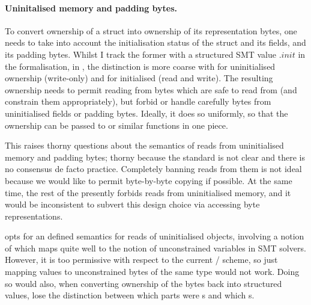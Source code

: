 \paragraph{Uninitalised memory and padding bytes.}%
To convert ownership of a struct into ownership of its representation bytes,
one needs to take into account the initialisation status of the struct and its
fields, and its padding bytes. Whilst I track the former with a structured SMT
value $.\mathit{init}$ in the formalisation, in , the distinction is
more coarse with  for uninitialised ownership (write-only) and
 for initialised (read and write). The resulting ownership
needs to permit reading from bytes which are safe to read from (and constrain
them appropriately), but forbid or handle carefully bytes from uninitialised
fields or padding bytes. Ideally, it does so uniformly, so that the ownership
can be passed to  or similar functions in one piece.

This raises thorny questions about the semantics of reads from uninitialised
memory and padding bytes; thorny because the  standard is not clear and
there is no consensus de facto practice. Completely banning reads from them is
not ideal because we would like to permit byte-by-byte copying if possible. At
the same time, the rest of the  presently forbids reads from
uninitialised memory, and it
would be inconsistent to subvert this design choice via accessing byte
representations.

 opts for an defined semantics for reads of uninitialised objects,
involving a notion of  which maps quite well to
the notion of unconstrained variables in SMT solvers. However, it is too
permissive with respect to the current /
scheme, so just mapping  values to unconstrained
 bytes of the same type would not work. Doing so would also,
when converting ownership of the bytes back into structured values, lose the
distinction between which parts were s and which
s.

